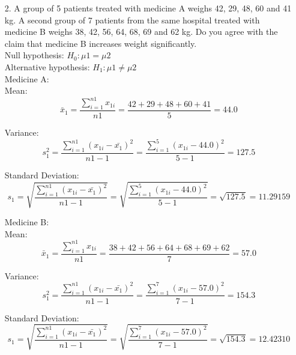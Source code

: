 \documentclass[a4paper,11pt,openright]{report}
\begin{document}
\begin{enumerate}
\vspace{1cm}

\item[2.] A group of 5 patients treated with medicine A weighs 42, 29, 48, 60 and 41 kg.
A second group of 7 patients from the same hospital treated with medicine B weighs 38, 42,
56, 64, 68, 69 and 62 kg. Do you agree with the claim that medicine B increases weight
significantly. \\

Null hypothesis: $H_{0}: \mu 1 = \mu 2$ \\
Alternative hypothesis: $H_{1}: \mu 1 \neq \mu 2$ \\

Medicine A: \\
\hspace*{10mm} Mean:
\begin{equation*}
\bar x_{1} = \frac{\sum\limits_{i=1}^{n1} x_{1i}}{n1}
		= \frac{42 + 29 + 48 + 60 + 41}{5} = 44.0
\end{equation*}

\hspace*{10mm} Variance:
\begin{equation*}
s_{1}^{2} = \frac{\sum\limits_{i=1}^{n1} (x_{1i} - \bar {x_{1}})^{2}}{n1 - 1}
	= \frac{\sum\limits_{i=1}^{5} (x_{1i} - 44.0)^{2}}{5 - 1} = 127.5
\end{equation*}

\hspace*{10mm} Standard Deviation:
\begin{equation*}
s_{1} = \sqrt{\frac{\sum\limits_{i=1}^{n1} (x_{1i} - \bar {x_{1}})^{2}}{n1 - 1}}
	= \sqrt{\frac{\sum\limits_{i=1}^{5} (x_{1i} - 44.0)^{2}}{5 -1}}
	= \sqrt{127.5} = 11.29159
\end{equation*}

Medicine B: \\
\hspace*{10mm} Mean:
\begin{equation*}
\bar x_{1} = \frac{\sum\limits_{i=1}^{n1} x_{1i}}{n1}
		= \frac{38 + 42 + 56 + 64 + 68 + 69 + 62}{7} = 57.0
\end{equation*}

\hspace*{10mm} Variance:
\begin{equation*}
s_{1}^{2} = \frac{\sum\limits_{i=1}^{n1} (x_{1i} - \bar {x_{1}})^{2}}{n1 - 1}
	= \frac{\sum\limits_{i=1}^{7} (x_{1i} - 57.0)^{2}}{7 - 1} = 154.3
\end{equation*}

\hspace*{10mm} Standard Deviation:
\begin{equation*}
s_{1} = \sqrt{\frac{\sum\limits_{i=1}^{n1} (x_{1i} - \bar {x_{1}})^{2}}{n1 - 1}}
	= \sqrt{\frac{\sum\limits_{i=1}^{7} (x_{1i} - 57.0)^{2}}{7 -1}}
	= \sqrt{154.3} = 12.42310
\end{equation*}


\end{enumerate}
\end{document}
